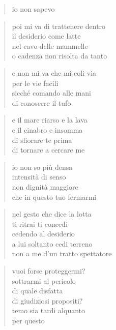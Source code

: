 	\begin{verse}
		io non sapevo
	\end{verse}

\clearpage


	\begin{verse}
		poi mi va di trattenere dentro\\
		il desiderio come latte\\
		nel cavo delle mammelle\\
		o cadenza non risolta da tanto
	\end{verse}

	\begin{verse}
		e non mi va che mi coli via\\
		per le vie facili\\
		sicché comando alle mani\\
		di conoscere il tufo
	\end{verse}

	\begin{verse}
		e il mare riarso e la lava\\
		e il cinabro e insomma\\
		di sfiorare te prima\\
		di tornare a cercare me
	\end{verse}

\clearpage


	\begin{verse}
		io non so più densa\\
		intensità di senso\\
		non dignità maggiore\\
		che in questo tuo fermarmi
	\end{verse}

	\begin{verse}
		nel gesto che dice la lotta\\
		ti ritrai ti concedi\\
		cedendo al desiderio\\
		a lui soltanto cedi terreno\\
		non a me d'un tratto spettatore
	\end{verse}

	\begin{verse}
		vuoi forse proteggermi?\\
		sottrarmi al pericolo\\
		di quale disfatta\\
		di giudiziosi propositi?\\
		temo sia tardi alquanto\\
		per questo
	\end{verse}

